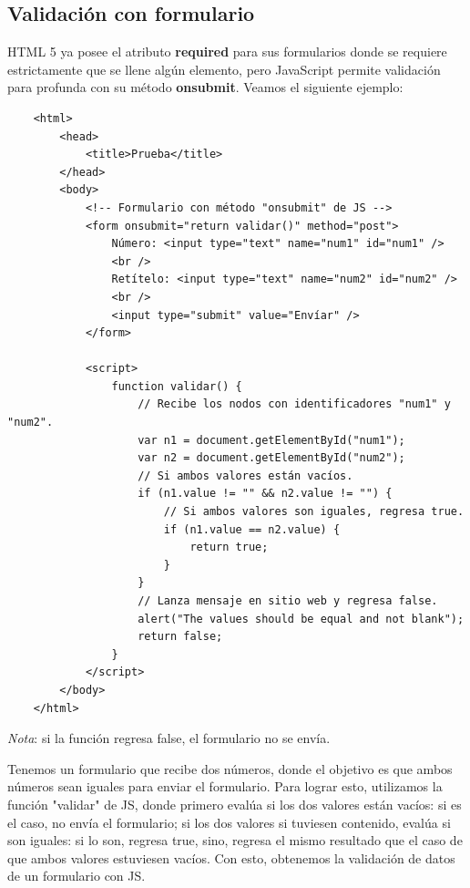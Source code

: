 \subsection{Validación con formulario}
\hspace{0.55cm}HTML 5 ya posee el atributo \textbf{required} para sus formularios donde se requiere estrictamente que se llene algún elemento, pero JavaScript permite validación para profunda con su método \textbf{onsubmit}. Veamos el siguiente ejemplo:
\begin{lstlisting}
    <html>
        <head>
            <title>Prueba</title>
        </head>
        <body>
            <!-- Formulario con método "onsubmit" de JS -->
            <form onsubmit="return validar()" method="post">
                Número: <input type="text" name="num1" id="num1" />
                <br />
                Retítelo: <input type="text" name="num2" id="num2" />
                <br />
                <input type="submit" value="Envíar" />
            </form>
            
            <script>
                function validar() {
                    // Recibe los nodos con identificadores "num1" y "num2".
                    var n1 = document.getElementById("num1");
                    var n2 = document.getElementById("num2");
                    // Si ambos valores están vacíos.
                    if (n1.value != "" && n2.value != "") {
                        // Si ambos valores son iguales, regresa true.
                        if (n1.value == n2.value) {
                            return true;
                        }
                    }
                    // Lanza mensaje en sitio web y regresa false.
                    alert("The values should be equal and not blank");
                    return false;
                }
            </script>
        </body>
    </html>
\end{lstlisting}

\textit{Nota}: si la función regresa false, el formulario no se envía.

Tenemos un formulario que recibe dos números, donde el objetivo es que ambos números sean iguales para enviar el formulario. Para lograr esto, utilizamos la función "validar" de JS, donde primero evalúa si los dos valores están vacíos: si es el caso, no envía el formulario; si los dos valores si tuviesen contenido, evalúa si son iguales: si lo son, regresa true, sino, regresa el mismo resultado que el caso de que ambos valores estuviesen vacíos. Con esto, obtenemos la validación de datos de un formulario con JS.